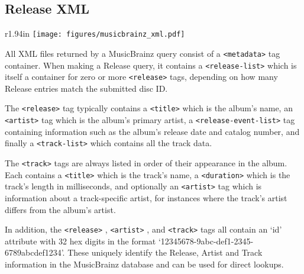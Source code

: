 \subsection{Release XML}
\begin{wrapfigure}[21]{r}{1.94in}
\texttt{[image: figures/musicbrainz\_xml.pdf]}
\end{wrapfigure}
All XML files returned by a MusicBrainz query consist of a
\texttt{<metadata>}
tag container.
When making a Release query, it contains a
\texttt{<release-list>}
which is itself a container for zero or more
\texttt{<release>}
tags, depending on how many Release entries match the submitted
disc ID.

The
\texttt{<release>}
tag typically contains a
\texttt{<title>}
which is the album's name,
an
\texttt{<artist>}
tag which is the album's primary artist,
a
\texttt{<release-event-list>}
tag containing information such as the album's
release date and catalog number,
and finally a
\texttt{<track-list>}
which contains all the track data.

The
\texttt{<track>}
tags are always listed in order of their appearance in the album.
Each contains a
\texttt{<title>}
which is the track's name,
a
\texttt{<duration>}
which is the track's length in milliseconds,
and optionally an
\texttt{<artist>}
tag which is information about a track-specific artist,
for instances where the track's artist differs from the album's artist.

In addition, the
\texttt{<release>}
,
\texttt{<artist>}
,
and
\texttt{<track>}
tags all contain an `id' attribute with 32 hex digits in the format
`12345678-9abc-def1-2345-6789abcdef1234'.
These uniquely identify the Release, Artist and Track information
in the MusicBrainz database and can be used for direct lookups.

